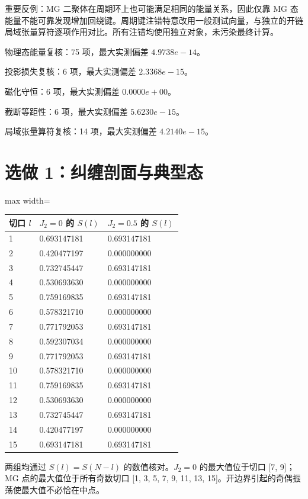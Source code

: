 \documentclass[zihao=5,a4paper]{ctexart}
\begin{document}
重要反例：MG 二聚体在周期环上也可能满足相同的能量关系，因此仅靠 MG 态能量不能可靠发现增加回绕键。周期键注错特意改用一般测试向量，与独立的开链局域张量算符逐项作用对比。所有注错均使用独立对象，未污染最终计算。


物理态能量复核：75 项，最大实测偏差 $4.9738e-14$。


投影损失复核：6 项，最大实测偏差 $2.3368e-15$。


磁化守恒：6 项，最大实测偏差 $0.0000e+00$。


截断等距性：6 项，最大实测偏差 $5.6230e-15$。


局域张量算符复核：14 项，最大实测偏差 $4.2140e-15$。


\section{选做 1：纠缠剖面与典型态}

\begin{center}
\small
\begin{adjustbox}{max width=\linewidth}
\begin{tabular}{lll}
\toprule
切口 $l$ & $J_2=0$ 的 $S(l)$ & $J_2=0.5$ 的 $S(l)$ \\
\midrule
1 & 0.693147181 & 0.693147181 \\
2 & 0.420477197 & 0.000000000 \\
3 & 0.732745447 & 0.693147181 \\
4 & 0.530693630 & 0.000000000 \\
5 & 0.759169835 & 0.693147181 \\
6 & 0.578321710 & 0.000000000 \\
7 & 0.771792053 & 0.693147181 \\
8 & 0.592307034 & 0.000000000 \\
9 & 0.771792053 & 0.693147181 \\
10 & 0.578321710 & 0.000000000 \\
11 & 0.759169835 & 0.693147181 \\
12 & 0.530693630 & 0.000000000 \\
13 & 0.732745447 & 0.693147181 \\
14 & 0.420477197 & 0.000000000 \\
15 & 0.693147181 & 0.693147181 \\
\bottomrule
\end{tabular}
\end{adjustbox}
\end{center}

两组均通过 $S(l)=S(N-l)$ 的数值核对。$J_2=0$ 的最大值位于切口 [7, 9]；MG 点的最大值位于所有奇数切口 [1, 3, 5, 7, 9, 11, 13, 15]。开边界引起的奇偶振荡使最大值不必恰在中点。
\end{document}
